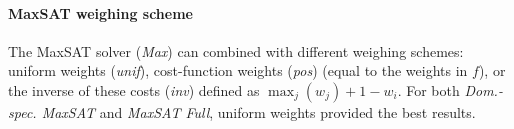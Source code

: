 \documentclass[a4paper,UKenglish,cleveref, autoref, thm-restate, pdfa]{lipics-v2021}
\newcommand\mm[1]{\ensuremath{#1}\xspace}
\newcommand\call[1]{\mm{\texttt{#1}}}
\newcommand\sat{\texttt{{SAT}}\xspace}
\newcommand\grow{\mm{\call{Grow}}}
\newcommand\maxsat{MaxSAT\xspace}
\begin{document}
			\paragraph{MaxSAT weighing scheme} The \maxsat solver (\emph{Max}) can combined with different weighing schemes: uniform weights (\emph{unif}), cost-function weights (\emph{pos}) (equal to the weights in $f$), or the inverse of these costs (\emph{inv}) defined as $\max_j(w_j) + 1 - w_i$. For both \emph{Dom.-spec. \maxsat} and \emph{MaxSAT Full}, uniform weights provided the best results.
			
			
			
\end{document}
